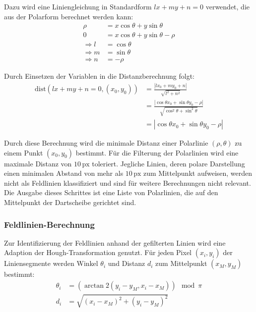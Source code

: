 Dazu wird eine Liniengleichung in Standardform $ lx + my + n = 0 $ verwendet, die aus der Polarform berechnet werden kann:
\begin{align*}
    \rho          & = x \cos{\theta} + y \sin{\theta}        \\
    0             & = x \cos{\theta} + y \sin{\theta} - \rho \\
    \Rightarrow l & = \cos{\theta}                           \\
    \Rightarrow m & = \sin{\theta}                           \\
    \Rightarrow n & = -\rho
\end{align*}

Durch Einsetzen der Variablen in die Distanzberechnung folgt:
\begin{align*}
    \text{dist}(lx + my + n = 0, (x_0, y_0)) & = \frac{| l x_0 + m y_0 + n|}{\sqrt{l^2+n^2}}                                                   \\
                                             & = \frac{| \cos{\theta} x_0 + \sin{\theta} y_0 - \rho |}{\sqrt{\cos^2{\theta} + \sin^2{\theta}}} \\
                                             & = | \cos{\theta} x_0 + \sin{\theta} y_0 - \rho |
\end{align*}

Durch diese Berechnung wird die minimale Distanz einer Polarlinie $(\rho, \theta)$ zu einem Punkt $(x_0, y_0)$ bestimmt. Für die Filterung der Polarlinien wird eine maximale Distanz von $10\,\text{px}$ toleriert. Jegliche Linien, deren polare Darstellung einen minimalen Abstand von mehr als $10\,\text{px}$ zum Mittelpunkt aufweisen, werden nicht als Feldlinien klassifiziert und sind für weitere Berechnungen nicht relevant. Die Ausgabe dieses Schrittes ist eine Liste von Polarlinien, die auf den Mittelpunkt der Dartscheibe gerichtet sind.

\subsubsection{Feldlinien-Berechnung}
\label{sec:impl:cv:lines:fields}

Zur Identifizierung der Feldlinien anhand der gefilterten Linien wird eine Adaption der Hough-Transformation genutzt. Für jeden Pixel $(x_i, y_i)$ der Liniensegmente werden Winkel $\theta_i$ und Distanz $d_i$ zum Mittelpunkt $(x_M, y_M)$ bestimmt:
\begin{align*}
    \theta_i & =(\arctan2{(y_i - y_M, x_i - x_M)}) \mod \pi \\
    d_i      & =\sqrt{(x_i - x_M)^2+(y_i - y_M)^2}
\end{align*}

